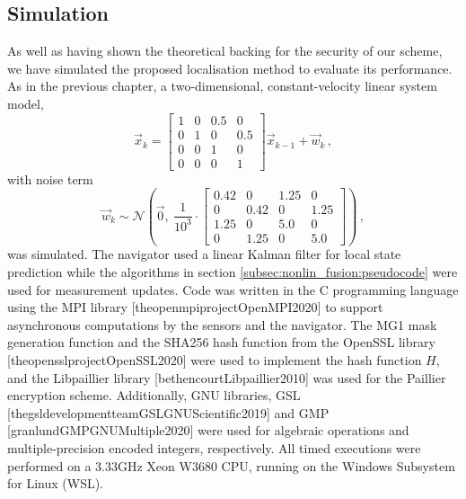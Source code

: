 \subsection{Simulation}\label{subsec:nonlin_fusion:simulation}
As well as having shown the theoretical backing for the security of our scheme, we have simulated the proposed localisation method to evaluate its performance. As in the previous chapter, a two-dimensional, constant-velocity linear system model,
\begin{equation}\label{eq:nonlin_fusion:simulation_system_model}
    \vec{x}_{k} = 
    \begin{bmatrix}
        1 & 0 & 0.5 & 0\\
        0 & 1 & 0   & 0.5\\
        0 & 0 & 1   & 0\\
        0 & 0 & 0   & 1
    \end{bmatrix}\vec{x}_{k-1} + \vec{w}_k\,,
\end{equation}
with noise term
\begin{equation}
    \vec{w}_k\sim\mathcal{N}\left(\vec{0},\ \frac{1}{10^{3}}\cdot
    \begin{bmatrix}
        0.42 & 0    & 1.25 & 0\\
        0    & 0.42 & 0    & 1.25\\
        1.25 & 0    & 5.0  & 0\\
        0    & 1.25 & 0    & 5.0
    \end{bmatrix}
    \right)\,,
\end{equation}
was simulated. The navigator used a linear Kalman filter for local state prediction while the algorithms in section \ref{subsec:nonlin_fusion:pseudocode} were used for measurement updates. Code was written in the C programming language using the MPI library [theopenmpiprojectOpenMPI2020] to support asynchronous computations by the sensors and the navigator. The MG1 mask generation function and the SHA256 hash function from the OpenSSL library [theopensslprojectOpenSSL2020] were used to implement the hash function $H$, and the Libpaillier library [bethencourtLibpaillier2010] was used for the Paillier encryption scheme. Additionally, GNU libraries, GSL [thegsldevelopmentteamGSLGNUScientific2019] and GMP [granlundGMPGNUMultiple2020] were used for algebraic operations and multiple-precision encoded integers, respectively. All timed executions were performed on a 3.33GHz Xeon W3680 CPU, running on the Windows Subsystem for Linux (WSL).

